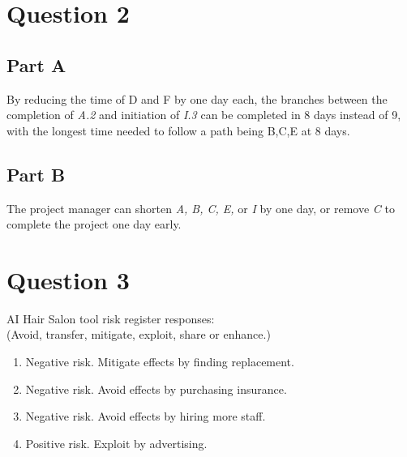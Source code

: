 \documentclass{article}
\begin{document}
\section{Question 2}
\subsection{Part A}
By reducing the time of D and F by one day each, the branches between the completion of {\it A.2} and initiation of {\it I.3} can be completed in 8 days instead of 9, with the longest time needed to follow a path being B,C,E at 8 days.
\subsection{Part B}
The project manager can shorten {\it A, B, C, E,} or {\it I} by one day, or remove {\it C} to complete the project one day early.
\section{Question 3}
AI Hair Salon tool risk register responses:\\(Avoid, transfer, mitigate, exploit, share or enhance.)
\begin{enumerate}
\item Negative risk. Mitigate effects by finding replacement.
\item Negative risk. Avoid effects by purchasing insurance.
\item Negative risk. Avoid effects by hiring more staff.
\item Positive risk. Exploit by advertising.
\end{enumerate}
\end{document}
